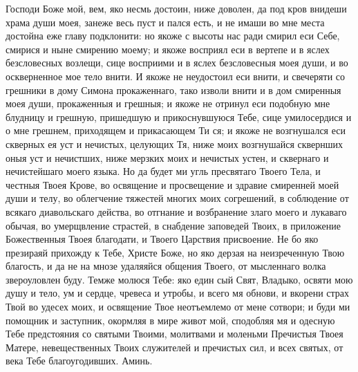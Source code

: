 \begin{mymulticols}
Господи Боже мой, вем, яко несмь достоин, ниже доволен, да под кров внидеши храма души моея, занеже весь пуст и пался есть, и не имаши во мне места достойна еже главу подклонити: но якоже с высоты нас ради смирил еси Себе, смирися и ныне смирению моему; и якоже восприял еси в вертепе и в яслех безсловесных возлещи, сице восприими и в яслех безсловесныя моея души, и во оскверненное мое тело внити. И якоже не неудостоил еси внити, и свечеряти со грешники в дому Симона прокаженнаго, тако изволи внити и в дом смиренныя моея души, прокаженныя и грешныя; и якоже не отринул еси подобную мне блудницу и грешную, пришедшую и прикоснувшуюся Тебе, сице умилосердися и о мне грешнем, приходящем и прикасающем Ти ся; и якоже не возгнушался еси скверных ея уст и нечистых, целующих Тя, ниже моих возгнушайся сквернших оныя уст и нечистших, ниже мерзких моих и нечистых устен, и сквернаго и нечистейшаго моего языка. Но да будет ми угль пресвятаго Твоего Тела, и честныя Твоея Крове, во освящение и просвещение и здравие смиренней моей души и телу, во облегчение тяжестей многих моих согрешений, в соблюдение от всякаго диавольскаго действа, во отгнание и возбранение злаго моего и лукаваго обычая, во умерщвление страстей, в снабдение заповедей Твоих, в приложение Божественныя Твоея благодати, и Твоего Царствия присвоение. Не бо яко презираяй прихожду к Тебе, Христе Боже, но яко дерзая на неизреченную Твою благость, и да не на мнозе удаляяйся общения Твоего, от мысленнаго волка звероуловлен буду. Темже молюся Тебе: яко един сый Свят, Владыко, освяти мою душу и тело, ум и сердце, чревеса и утробы, и всего мя обнови, и вкорени страх Твой во удесех моих, и освящение Твое неотъемлемо от мене сотвори; и буди ми помощник и заступник, окормляя в мире живот мой, сподобляя мя и одесную Тебе предстояния со святыми Твоими, молитвами и моленьми Пречистыя Твоея Матере, невещественных Твоих служителей и пречистых сил, и всех святых, от века Тебе благоугодивших. Аминь.



\end{mymulticols}
